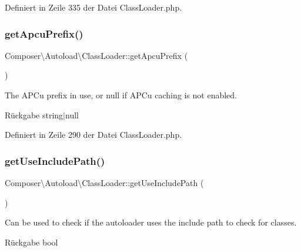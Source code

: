 Definiert in Zeile 335 der Datei Class\+Loader.\+php.

\mbox{\label{class_composer_1_1_autoload_1_1_class_loader_aca46c66a148234ea06274030062d0cdf}} 
\subsubsection{\texorpdfstring{get\+Apcu\+Prefix()}{getApcuPrefix()}}
{\footnotesize\ttfamily Composer\textbackslash{}\+Autoload\textbackslash{}\+Class\+Loader\+::get\+Apcu\+Prefix (\begin{DoxyParamCaption}{ }\end{DoxyParamCaption})}

The A\+P\+Cu prefix in use, or null if A\+P\+Cu caching is not enabled.

\begin{DoxyReturn}{Rückgabe}
string$\vert$null 
\end{DoxyReturn}


Definiert in Zeile 290 der Datei Class\+Loader.\+php.

\mbox{\label{class_composer_1_1_autoload_1_1_class_loader_aeb0360ce32c89c3d50cf5b054aef0d59}} 
\subsubsection{\texorpdfstring{get\+Use\+Include\+Path()}{getUseIncludePath()}}
{\footnotesize\ttfamily Composer\textbackslash{}\+Autoload\textbackslash{}\+Class\+Loader\+::get\+Use\+Include\+Path (\begin{DoxyParamCaption}{ }\end{DoxyParamCaption})}

Can be used to check if the autoloader uses the include path to check for classes.

\begin{DoxyReturn}{Rückgabe}
bool 
\end{DoxyReturn}


